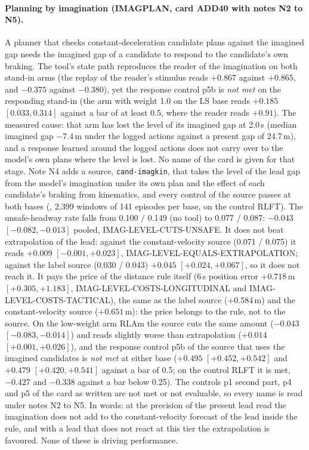 \paragraph{Planning by imagination (IMAGPLAN, card ADD40 with notes N2 to N5).} A planner that checks constant-deceleration candidate plans against the imagined gap needs the imagined gap of a candidate to respond to the candidate's own braking. The tool's state path reproduces the reader of the imagination on both stand-in arms (the replay of the reader's stimulus reads $+0.867$ against $+0.865$, and $-0.375$ against $-0.380$), yet the response control p5b is \emph{not met} on the responding stand-in (the arm with weight 1.0 on the LS base reads $+0.185$ $[0.033,0.314]$ against a bar of at least 0.5, where the reader reads $+0.91$). The measured cause: that arm has lost the level of its imagined gap at 2.0\,s (median imagined gap $-7.4$\,m under the logged actions against a present gap of 24.7\,m), and a response learned around the logged actions does not carry over to the model's own plans where the level is lost. No name of the card is given for that stage. Note N4 adds a source, \texttt{cand-imagkin}, that takes the level of the lead gap from the model's imagination under its own plan and the effect of each candidate's braking from kinematics, and every control of the source passes at both bases (, 2,399 windows of 141 episodes per base, on the control RLFT). The unsafe-headway rate falls from 0.100 / 0.149 (no tool) to 0.077 / 0.087: $-0.043$ $[-0.082,-0.013]$ pooled, IMAG-LEVEL-CUTS-UNSAFE. It does not beat extrapolation of the lead: against the constant-velocity source (0.071 / 0.075) it reads $+0.009$ $[-0.001,+0.023]$, IMAG-LEVEL-EQUALS-EXTRAPOLATION; against the label source (0.030 / 0.043) $+0.045$ $[+0.024,+0.067]$, so it does not reach it. It pays the price of the distance rule itself (6\,s position error $+0.718$\,m $[+0.305,+1.183]$, IMAG-LEVEL-COSTS-LONGITUDINAL and IMAG-LEVEL-COSTS-TACTICAL), the same as the label source ($+0.584$\,m) and the constant-velocity source ($+0.651$\,m): the price belongs to the rule, not to the source. On the low-weight arm RLAm the source cuts the same amount ($-0.043$ $[-0.083,-0.014]$) and reads slightly worse than extrapolation ($+0.014$ $[+0.001,+0.026]$), and the response control p5b of the source that uses the imagined candidates is \emph{not met} at either base ($+0.495$ $[+0.452,+0.542]$ and $+0.479$ $[+0.420,+0.541]$ against a bar of 0.5; on the control RLFT it is met, $-0.427$ and $-0.338$ against a bar below 0.25). The controls p1 second part, p4 and p5 of the card as written are not met or not evaluable, so every name is read under notes N2 to N5. In words: at the precision of the present lead read the imagination does not add to the constant-velocity forecast of the lead inside the rule, and with a lead that does not react at this tier the extrapolation is favoured. None of these is driving performance.


